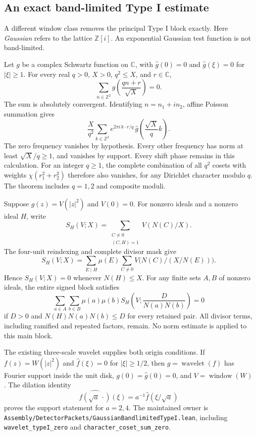 \subsection{An exact band-limited Type I estimate}
\label{sec:bandlimited-type-i}

A different window class removes the principal Type I block exactly.
Here \emph{Gaussian} refers to the lattice \(\mathbb Z[i]\).
An exponential Gaussian test function is not band-limited.

Let \(g\) be a complex Schwartz function on \(\mathbb C\), with
\(\widehat g(0)=0\) and \(\widehat g(\xi)=0\) for \(|\xi|\ge1\).
For every real \(q>0\), \(X>0\), \(q^2\le X\), and \(r\in\mathbb C\),
\begin{equation}\label{eq:bandlimited-coset-zero}
 \sum_{n\in\mathbb Z^2}
   g\!\left(\frac{qn+r}{\sqrt X}\right)=0.
\end{equation}
The sum is absolutely convergent. Identifying \(n=n_1+in_2\),
affine Poisson summation gives
\[
 \frac{X}{q^2}\sum_{k\in\mathbb Z^2}
   e^{2\pi i\, k\cdot r/q}\,
   \widehat g\!\left(\frac{\sqrt X}{q}k\right).
\]
The zero frequency vanishes by hypothesis. Every other frequency has
norm at least \(\sqrt X/q\ge1\), and vanishes by support.
Every shift phase remains in this calculation.
For an integer \(q\ge1\), the complete combination of all \(q^2\)
cosets with weights \(\chi(r_1^2+r_2^2)\) therefore also vanishes,
for any Dirichlet character modulo \(q\). The theorem includes
\(q=1,2\) and composite moduli.

Suppose \(g(z)=V(|z|^2)\) and \(V(0)=0\). For nonzero ideals and
a nonzero ideal \(H\), write
\[
 S_H(V;X)=\sum_{\substack{C\ne0\\(C,H)=1}}V(N(C)/X).
\]
The four-unit reindexing and complete divisor mask give
\[
 S_H(V;X)=\sum_{E\mid H}\mu(E)
          \sum_{C\ne0}V\bigl(N(C)/(X/N(E))\bigr).
\]
Hence \(S_H(V;X)=0\) whenever \(N(H)\le X\). For any finite sets
\(A,B\) of nonzero ideals, the entire signed block satisfies
\begin{equation}\label{eq:bandlimited-type-i-zero}
 \sum_{a\in A}\sum_{b\in B}\mu(a)\mu(b)
       S_H\!\left(V;\frac{D}{N(a)N(b)}\right)=0
\end{equation}
if \(D>0\) and \(N(H)N(a)N(b)\le D\) for every retained pair.
All divisor terms, including ramified and repeated factors, remain.
No norm estimate is applied to this main block.

The existing three-scale wavelet supplies both origin conditions.
If \(f(z)=W(|z|^2)\) and \(\widehat f(\xi)=0\) for \(|\xi|\ge1/2\),
then \(g=\operatorname{wavelet}(f)\) has Fourier support inside the
unit disk, \(g(0)=\widehat g(0)=0\), and
\(V=\operatorname{window}(W)\). The dilation identity
\[
 \widehat{f(\sqrt a\,\cdot)}(\xi)
       =a^{-1}\widehat f(\xi/\sqrt a)
\]
proves the support statement for \(a=2,4\).
The maintained owner is
\texttt{Assembly/DetectorPackets/GaussianBandlimitedTypeI.lean},
including \texttt{wavelet\_typeI\_zero} and
\texttt{character\_coset\_sum\_zero}.

